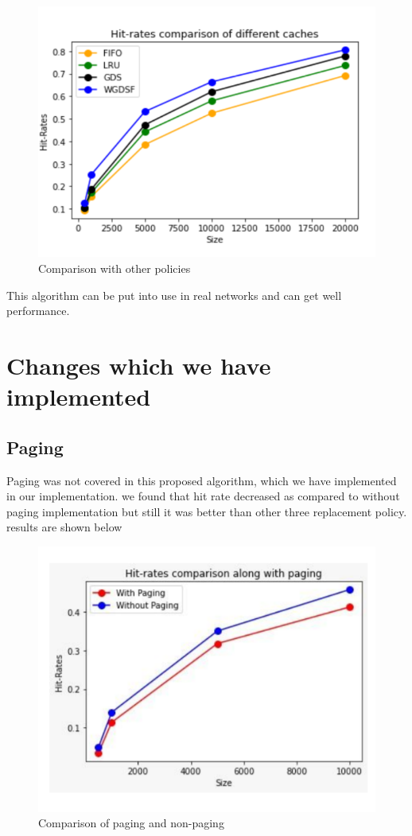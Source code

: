 \documentclass[conference]{IEEEtran}
\begin{document}
\begin{figure}[htbp]
\centerline{\includegraphics[width = 0.8\linewidth]{testing.png}}
\caption{Comparison with other policies}
\label{fig}
\end{figure}

This algorithm can be put into use in real networks and can get well performance.

\section{Changes which we have implemented}
\subsection{Paging}
Paging was not covered in this proposed algorithm, which we have implemented in our implementation. we found that hit rate decreased as compared to without paging implementation but still it was better than other three replacement policy. results are shown below

\begin{figure}[htbp]
\centerline{\includegraphics[width = 0.8\linewidth]{paging.png}}
\caption{Comparison of paging and non-paging}
\label{fig}
\end{figure}
\end{document}
